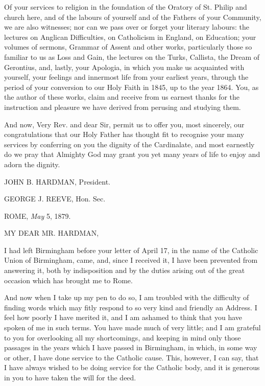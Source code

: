 Of your services to religion in the foundation of the Oratory
of St. Philip and church here, and of the labours of yourself and of
the Fathers of your Community, we are also witnesses; nor can we pass
over or forget your literary labours: the lectures on Anglican
Difficulties, on Catholicism in England, on Education; your volumes of
sermons, Grammar of Assent and other works, particularly those so
familiar to us as Loss and Gain, the lectures on the Turks, Callista,
the Dream of Gerontius, and, lastly, your Apologia, in which you make
us acquainted with yourself, your feelings and innermost life from
your earliest years, through the period of your conversion to our Holy
Faith in 1845, up to the year 1864. You, as the author of these works,
claim and receive from us earnest thanks for the instruction and
pleasure we have derived from perusing and studying them.

And now, Very Rev. and dear Sir, permit us to offer you, most
sincerely, our congratulations that our Holy Father has thought fit to
recognise your many services by conferring on you the dignity of the
Cardinalate, and most earnestly do we pray that Almighty God may grant
you yet many years of life to enjoy and adorn the dignity.

JOHN B. HARDMAN,
President.

GEORGE J. REEVE, Hon. Sec.


ROME, \emph{May} 5, 1879.

MY DEAR MR.
HARDMAN,

I had left Birmingham before your letter of April 17, in the name of
the Catholic Union of Birmingham, came, and, since I received it, I
have been prevented from answering it, both by indisposition and by
the duties arising out of the great occasion which has brought me to
Rome.

And now when I take up my pen to do so, I am troubled with the
difficulty of finding words which may fitly respond to so very kind
and friendly an Address. I feel how poorly I have merited it, and I am
ashamed to think that you have spoken of me in such terms. You have
made much of very little; and I am grateful to you for overlooking all
my shortcomings, and keeping in mind only those passages in the years
which I have passed in Birmingham, in which, in some way or other, I
have done service to the Catholic cause. This, however, I can say,
that I have always wished to be doing service for the Catholic body,
and it is generous in you to have taken the will for the deed.

